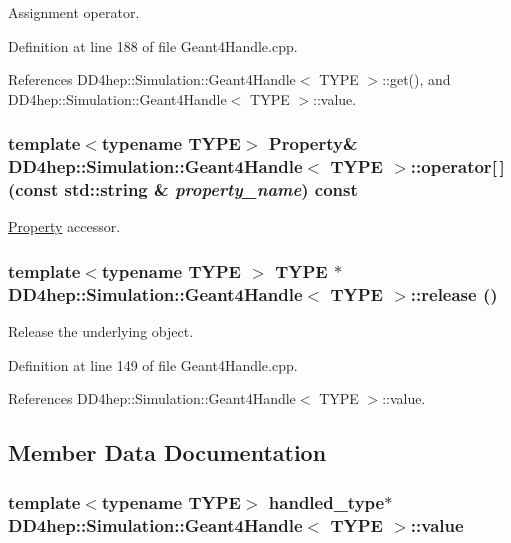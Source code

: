 Assignment operator. 

Definition at line 188 of file Geant4Handle.cpp.

References DD4hep::Simulation::Geant4Handle$<$ TYPE $>$::get(), and DD4hep::Simulation::Geant4Handle$<$ TYPE $>$::value.\hypertarget{class_d_d4hep_1_1_simulation_1_1_geant4_handle_a78e5e4da024f3da91e677898576d1180}{
\subsubsection[{operator[]}]{\setlength{\rightskip}{0pt plus 5cm}template$<$typename TYPE$>$ {\bf Property}\& {\bf DD4hep::Simulation::Geant4Handle}$<$ TYPE $>$::operator\mbox{[}$\,$\mbox{]} (const std::string \& {\em property\_\-name}) const}}
\label{class_d_d4hep_1_1_simulation_1_1_geant4_handle_a78e5e4da024f3da91e677898576d1180}


\hyperlink{class_d_d4hep_1_1_property}{Property} accessor. \hypertarget{class_d_d4hep_1_1_simulation_1_1_geant4_handle_a09da8eea7f4d324e8f5dcdc6b53bb861}{
\subsubsection[{release}]{\setlength{\rightskip}{0pt plus 5cm}template$<$typename TYPE $>$ TYPE $\ast$ {\bf DD4hep::Simulation::Geant4Handle}$<$ TYPE $>$::release ()}}
\label{class_d_d4hep_1_1_simulation_1_1_geant4_handle_a09da8eea7f4d324e8f5dcdc6b53bb861}


Release the underlying object. 

Definition at line 149 of file Geant4Handle.cpp.

References DD4hep::Simulation::Geant4Handle$<$ TYPE $>$::value.

\subsection{Member Data Documentation}
\hypertarget{class_d_d4hep_1_1_simulation_1_1_geant4_handle_a5bd7f10667956413e9aa66cad5ad9d7d}{
\subsubsection[{value}]{\setlength{\rightskip}{0pt plus 5cm}template$<$typename TYPE$>$ {\bf handled\_\-type}$\ast$ {\bf DD4hep::Simulation::Geant4Handle}$<$ TYPE $>$::{\bf value}}}
\label{class_d_d4hep_1_1_simulation_1_1_geant4_handle_a5bd7f10667956413e9aa66cad5ad9d7d}


